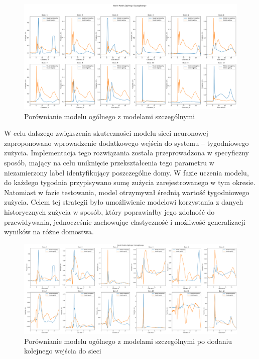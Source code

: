 \documentclass[a4paper,twoside,12pt]{book}
\begin{document}
\begin{figure}[!h]
	\centering
	\includegraphics[width=1\textwidth]{img/szczegółowy_ogolny_porówniaie.png}
	\caption{Porównianie modelu ogólnego z modelami szczególnymi}
	\label{fig:etykieta-rysunku}
\end{figure}

W celu dalszego zwiększenia skuteczności modelu sieci neuronowej zaproponowano wprowadzenie dodatkowego wejścia do systemu – tygodniowego zużycia. Implementacja tego rozwiązania została przeprowadzona w specyficzny sposób, mający na celu uniknięcie przekształcenia tego parametru w niezamierzony label identyfikujący poszczególne domy. W fazie uczenia modelu, do każdego tygodnia przypisywano sumę zużycia zarejestrowanego w tym okresie. Natomiast w fazie testowania, model otrzymywał średnią wartość tygodniowego zużycia. Celem tej strategii było umożliwienie modelowi korzystania z danych historycznych zużycia w sposób, który poprawiałby jego zdolność do przewidywania, jednocześnie zachowując elastyczność i możliwość generalizacji wyników na różne domostwa.

\newpage

\begin{figure}[!h]
	\centering
	\includegraphics[width=1\textwidth]{img/szczegółowy_ogolny_porówniaie_dodatkowy.png}
	\caption{Porównianie modelu ogólnego z modelami szczególnymi po dodaniu kolejnego wejścia do sieci}
	\label{fig:etykieta-rysunku}
\end{figure}
\end{document}
